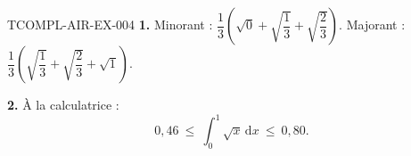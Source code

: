 \begin{corrige}{TCOMPL-AIR-EX-004}
\textbf{1.} Minorant : $\dfrac{1}{3}\left(\sqrt{0}+\sqrt{\dfrac{1}{3}}+\sqrt{\dfrac{2}{3}}\right)$. Majorant : $\dfrac{1}{3}\left(\sqrt{\dfrac{1}{3}}+\sqrt{\dfrac{2}{3}}+\sqrt{1}\right)$.

\textbf{2.} À la calculatrice :
\[
  0{,}46 \ \leq\ \int_0^1 \sqrt{x}\,\mathrm{d}x \ \leq\ 0{,}80.
\]
\end{corrige}
